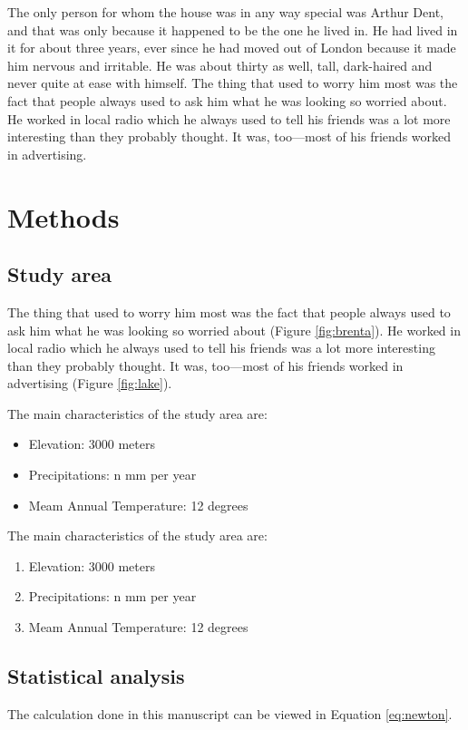 The only person for whom the house was in any way special was Arthur Dent, and that was only because it happened to be the one he lived in. He had lived in it for about three years, ever since he had moved out of London because it made him nervous and irritable. He was about thirty as well, tall, dark-haired and never quite at ease with himself. The thing that used to worry him most was the fact that people always used to ask him what he was looking so worried about. He worked in local radio which he always used to tell his friends was a lot more interesting than they probably thought. It was, too—most of his friends worked in advertising.

\section{Methods}\label{sec:methods}
\subsection{Study area} %
The thing that used to worry him most was the fact that people always used to ask him what he was looking so worried about (Figure \ref{fig:brenta}). He worked in local radio which he always used to tell his friends was a lot more interesting than they probably thought. It was, too—most of his friends worked in advertising (Figure \ref{fig:lake}).

\noindent The main characteristics of the study area are:
\begin{itemize}
    \item Elevation: 3000 meters
    \item Precipitations: n mm per year
    \item Meam Annual Temperature: 12 degrees
\end{itemize}

\noindent The main characteristics of the study area are:
\begin{enumerate}
    \item Elevation: 3000 meters
    \item Precipitations: n mm per year
    \item Meam Annual Temperature: 12 degrees
\end{enumerate}

\subsection{Statistical analysis}
The calculation done in this manuscript can be viewed in Equation \ref{eq:newton}.


